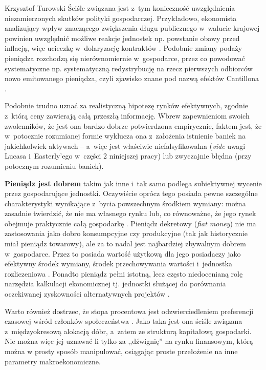 \begin{artplenv}{Krzysztof Turowski}
Ściśle związana jest z~tym konieczność uwzględnienia niezamierzonych skutków polityki gospodarczej. Przykładowo,
ekonomista analizujący wpływ znaczącego zwiększenia długu publicznego w~walucie krajowej powinien uwzględnić możliwe
reakcje jednostek np. powstanie obawy przed inflacją, więc ucieczkę w~dolaryzację kontraktów
\parencite{palley_money_2015}.
Podobnie zmiany podaży pieniądza rozchodzą się nierównomiernie w~gospodarce,
przez co powodować systematyczne np. systematyczną redystrybucję na rzecz pierwszych odbiorców nowo emitowanego
pieniądza, czyli zjawisko znane pod nazwą efektów Cantillona
\parencite{sieron_efekt_2017}.

Podobnie trudno uznać za realistyczną hipotezę rynków efektywnych, zgodnie z~którą ceny zawierają całą przeszłą
informację. Wbrew zapewnieniom swoich zwolenników, że jest ona bardzo dobrze potwierdzona empirycznie, faktem jest, że
w~potocznie rozumianej formie wyklucza ona z~założenia istnienie baniek na jakichkolwiek aktywach  --  a~więc
jest właściwie niefalsyfikowalna (\textit{vide} uwagi Lucasa i~Easterly’ego w~części 2 niniejszej pracy) lub zwyczajnie
błędna (przy potocznym rozumieniu baniek).

\textbf{Pieniądz jest dobrem} takim jak inne i~tak samo podlega subiektywnej wycenie przez gospodarujące jednostki.
Oczywiście oprócz tego posiada pewne szczególne charakterystyki wynikające z~bycia powszechnym środkiem wymiany: można
zasadnie twierdzić, że nie ma własnego rynku lub, co równoważne, że jego rynek obejmuje praktycznie całą gospodarkę
\parencite{horwitz_microfoundations_2000}.
Pieniądz dekretowy (\textit{fiat money}) nie ma zastosowania jako dobro
konsumpcyjne czy produkcyjne (tak jak historycznie miał pieniądz towarowy), ale za to nadal jest najbardziej zbywalnym
dobrem w~gospodarce. Przez to posiada wartość użytkową dla jego posiadaczy jako efektywny środek wymiany, środek
przechowywania wartości i~jednostka rozliczeniowa
\parencite{jevons_money_1876}.
Ponadto pieniądz pełni
istotną, lecz często niedocenianą rolę narzędzia kalkulacji ekonomicznej tj. jednostki służącej do porównania
oczekiwanej zyskowności alternatywnych projektów
\parencite{mises_kalkulacja_2011}.

Warto również dostrzec, że stopa procentowa jest odzwierciedleniem preferencji czasowej wśród członków społeczeństwa
\parencite{rothbard_man_1962}.
Jako taka jest ona ściśle związana z~międzyokresową alokacją dóbr, a~zatem
ze strukturą kapitałową gospodarki. Nie można więc jej uznawać li tylko za ,,dźwignię'' na rynku finansowym, którą można
w prosty sposób manipulować, osiągając proste przełożenie na inne parametry makroekonomiczne.


\end{artplenv}
